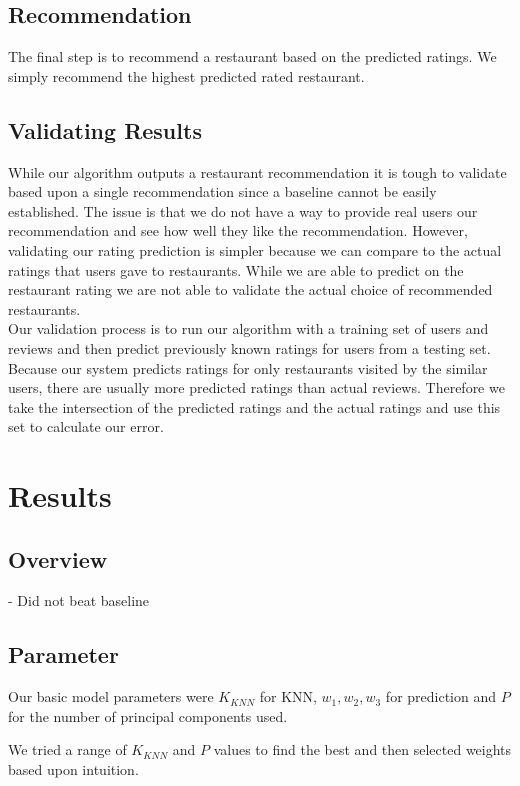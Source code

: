 \documentclass[10pt,twocolumn,letterpaper]{article}
\begin{document}
\subsection{Recommendation}
The final step is to recommend a restaurant based on the predicted ratings. We simply recommend the highest predicted rated restaurant.

\subsection{Validating Results}
While our algorithm outputs a restaurant recommendation it is tough to validate based upon a single recommendation since a baseline cannot be easily established. The issue is that we do not have a way to provide real users our recommendation and see how well they like the recommendation. However, validating our rating prediction is simpler because we can compare to the actual ratings that users gave to restaurants. While we are able to predict on the restaurant rating we are not able to validate the actual choice of recommended restaurants.
\\[0.5em]
\indent Our validation process is to run our algorithm with a training set of users and reviews and then predict previously known ratings for users from a testing set. Because our system predicts ratings for only restaurants visited by the similar users, there are usually more predicted ratings than actual reviews. Therefore we take the intersection of the predicted ratings and the actual ratings and use this set to calculate our error.


\section{Results}

\subsection{Overview}
- Did not beat baseline

\subsection{Parameter}
Our basic model parameters were $K_{KNN}$ for KNN, $w_{1}, w_2, w_3$ for prediction and $P$ for the number of principal components used.

We tried a range of $K_{KNN}$ and $P$ values to find the best and then selected weights based upon intuition.
\end{document}
